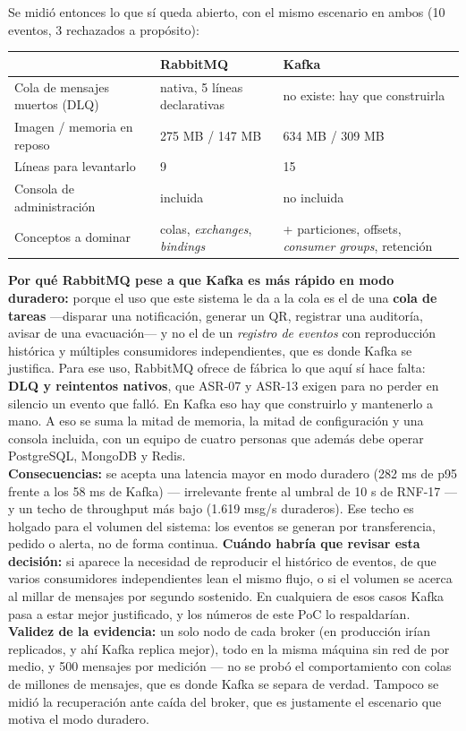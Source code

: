 \documentclass[11pt,a4paper]{article}
\begin{document}
Se midió entonces lo que sí queda abierto, con el mismo escenario en ambos (10 eventos, 3 rechazados
a propósito):

\begin{center}
\begin{tabular}{lll}
\toprule
 & \textbf{RabbitMQ} & \textbf{Kafka}\\
\midrule
Cola de mensajes muertos (DLQ) & nativa, 5 líneas declarativas & no existe: hay que construirla\\
Imagen / memoria en reposo & 275 MB / 147 MB & 634 MB / 309 MB\\
Líneas para levantarlo & 9 & 15\\
Consola de administración & incluida & no incluida\\
Conceptos a dominar & colas, \textit{exchanges}, \textit{bindings} & + particiones, offsets, \textit{consumer groups}, retención\\
\bottomrule
\end{tabular}
\end{center}

\textbf{Por qué RabbitMQ pese a que Kafka es más rápido en modo duradero:} porque el uso que este
sistema le da a la cola es el de una \textbf{cola de tareas} —disparar una notificación, generar un
QR, registrar una auditoría, avisar de una evacuación— y no el de un \textit{registro de eventos}
con reproducción histórica y múltiples consumidores independientes, que es donde Kafka se justifica.
Para ese uso, RabbitMQ ofrece de fábrica lo que aquí sí hace falta: \textbf{DLQ y reintentos
nativos}, que ASR-07 y ASR-13 exigen para no perder en silencio un evento que falló. En Kafka eso
hay que construirlo y mantenerlo a mano. A eso se suma la mitad de memoria, la mitad de
configuración y una consola incluida, con un equipo de cuatro personas que además debe operar
PostgreSQL, MongoDB y Redis.\\
\textbf{Consecuencias:} se acepta una latencia mayor en modo duradero (282 ms de p95 frente a los
58 ms de Kafka) --- irrelevante frente al umbral de 10 s de RNF-17 --- y un techo de throughput más
bajo (1.619 msg/s duraderos). Ese techo es holgado para el volumen del sistema: los eventos se
generan por transferencia, pedido o alerta, no de forma continua. \textbf{Cuándo habría que
revisar esta decisión:} si aparece la necesidad de reproducir el histórico de eventos, de que varios
consumidores independientes lean el mismo flujo, o si el volumen se acerca al millar de mensajes por
segundo sostenido. En cualquiera de esos casos Kafka pasa a estar mejor justificado, y los números de
este PoC lo respaldarían.\\
\textbf{Validez de la evidencia:} un solo nodo de cada broker (en producción irían replicados, y ahí
Kafka replica mejor), todo en la misma máquina sin red de por medio, y 500 mensajes por medición ---
no se probó el comportamiento con colas de millones de mensajes, que es donde Kafka se separa de
verdad. Tampoco se midió la recuperación ante caída del broker, que es justamente el escenario que
motiva el modo duradero.
\end{document}
